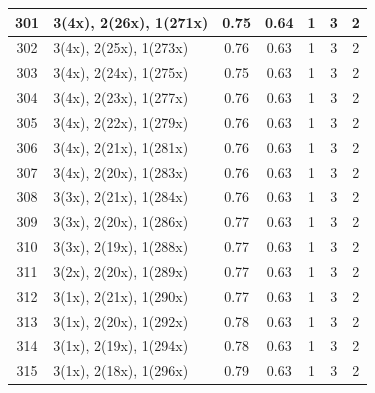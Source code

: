 \begin{small}
\begin{longtable}{|c|p{4cm}|c|c|c|c|c|}
  301 & 3(4x), 2(26x), 1(271x) & \cellcolor{colorBad}  0.75 & \cellcolor{colorBad} 0.64 & 1 & 3 & \cellcolor{colorGood} 2 \\   \hline
  302 & 3(4x), 2(25x), 1(273x) & \cellcolor{colorBad}  0.76 & \cellcolor{colorBad} 0.63 & 1 & 3 & \cellcolor{colorGood} 2 \\   \hline
  303 & 3(4x), 2(24x), 1(275x) & \cellcolor{colorBad}  0.75 & \cellcolor{colorBad} 0.63 & 1 & 3 & \cellcolor{colorGood} 2 \\   \hline
  304 & 3(4x), 2(23x), 1(277x) & \cellcolor{colorBad}  0.76 & \cellcolor{colorBad} 0.63 & 1 & 3 & \cellcolor{colorGood} 2 \\   \hline
  305 & 3(4x), 2(22x), 1(279x) & \cellcolor{colorBad}  0.76 & \cellcolor{colorBad} 0.63 & 1 & 3 & \cellcolor{colorGood} 2 \\   \hline
  306 & 3(4x), 2(21x), 1(281x) & \cellcolor{colorBad}  0.76 & \cellcolor{colorBad} 0.63 & 1 & 3 & \cellcolor{colorGood} 2 \\   \hline
  307 & 3(4x), 2(20x), 1(283x) & \cellcolor{colorBad}  0.76 & \cellcolor{colorBad} 0.63 & 1 & 3 & \cellcolor{colorGood} 2 \\   \hline
  308 & 3(3x), 2(21x), 1(284x) & \cellcolor{colorBad}  0.76 & \cellcolor{colorBad} 0.63 & 1 & 3 & \cellcolor{colorGood} 2 \\   \hline
  309 & 3(3x), 2(20x), 1(286x) & \cellcolor{colorBad}  0.77 & \cellcolor{colorBad} 0.63 & 1 & 3 & \cellcolor{colorGood} 2 \\   \hline
  310 & 3(3x), 2(19x), 1(288x) & \cellcolor{colorBad}  0.77 & \cellcolor{colorBad} 0.63 & 1 & 3 & \cellcolor{colorGood} 2 \\   \hline
  311 & 3(2x), 2(20x), 1(289x) & \cellcolor{colorBad}  0.77 & \cellcolor{colorBad} 0.63 & 1 & 3 & \cellcolor{colorGood} 2 \\   \hline
  312 & 3(1x), 2(21x), 1(290x) & \cellcolor{colorBad}  0.77 & \cellcolor{colorBad} 0.63 & 1 & 3 & \cellcolor{colorGood} 2 \\   \hline
  313 & 3(1x), 2(20x), 1(292x) & \cellcolor{colorBad}  0.78 & \cellcolor{colorBad} 0.63 & 1 & 3 & \cellcolor{colorGood} 2 \\   \hline
  314 & 3(1x), 2(19x), 1(294x) & \cellcolor{colorBad}  0.78 & \cellcolor{colorBad} 0.63 & 1 & 3 & \cellcolor{colorGood} 2 \\   \hline
  315 & 3(1x), 2(18x), 1(296x) & \cellcolor{colorBad}  0.79 & \cellcolor{colorBad} 0.63 & 1 & 3 & \cellcolor{colorGood} 2 \\   \hline

\end{longtable}
\end{small}
